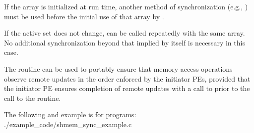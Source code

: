 \begin{apidefinition}
{    If the  array is initialized at run time, another method of
    synchronization (e.g., ) must be used before
    the initial use of that  array by .

    If the active set does not change,  can be called
    repeatedly with the same  array.  No additional synchronization
    beyond that implied by  itself is necessary in this case.

    The  routine can be used to portably ensure that
    memory access operations observe remote updates in the order enforced by the
    initiator \acp{PE}, provided that the initiator PE ensures completion of remote
    updates with a call to  prior to the call to the
     routine.
}

\begin{apiexamples}

\apicexample
    {The following  and  example is
    for \Cstd[11] programs:}
    {./example_code/shmem_sync_example.c}
    {}

\end{apiexamples}

\end{apidefinition}

